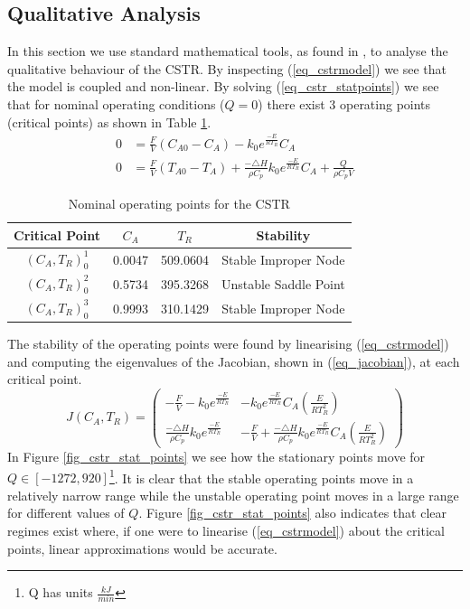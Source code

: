 \documentclass[../masters.tex]{subfiles}
\begin{document}
\subsection{Qualitative Analysis}
In this section we use standard mathematical tools, as found in \cite{edwardsandpenny}, to analyse the qualitative behaviour of the CSTR. By inspecting (\ref{eq_cstrmodel}) we see that the model is coupled and non-linear. By solving (\ref{eq_cstr_statpoints}) we see that for nominal operating conditions ($Q = 0$) there exist 3 operating points (critical points) as shown in Table \ref{tab_nominalstats}.
\begin{equation}
\begin{aligned}
0&= \frac{F}{V}\left( C_{A0}-C_A \right) - k_0e^{\frac{-E}{RT_R}}C_A \\
0 &= \frac{F}{V}\left(T_{A0}-T_A\right) + \frac{-\triangle H}{\rho C_p}k_0e^{\frac{-E}{RT_R}}C_A + \frac{Q}{\rho C_p V}
\end{aligned}
\label{eq_cstr_statpoints}
\end{equation}
\begin{table}[H]
\begin{center}
\begin{tabular}{c c c c}
\hline
Critical Point & $C_A$ & $T_R$ & Stability\\
\hline
$\left(C_A, T_R\right)_0^1$ & 0.0047 & 509.0604 & Stable Improper Node\\
$\left(C_A, T_R\right)_0^2$ & 0.5734 & 395.3268 & Unstable Saddle Point \\
$\left(C_A, T_R \right)_0^3$ & 0.9993 & 310.1429 & Stable Improper Node \\
\hline
\end{tabular}
\caption{Nominal operating points for  the CSTR}
\label{tab_nominalstats}
\end{center}
\end{table}
The stability of the operating points were found by linearising (\ref{eq_cstrmodel}) and computing the eigenvalues of the Jacobian, shown in (\ref{eq_jacobian}), at each critical point.
\begin{equation}
J(C_A, T_R) = \begin{pmatrix}
-\frac{F}{V} - k_0e^{\frac{-E}{RT_R}} & - k_0e^{\frac{-E}{RT_R}}C_A\left(\frac{E}{RT_R^2}\right) \\
\frac{-\triangle H}{\rho C_p}k_0e^{\frac{-E}{RT_R}} & -\frac{F}{V} + \frac{-\triangle H}{\rho C_p}k_0e^{\frac{-E}{RT_R}}C_A\left(\frac{E}{RT_R^2}\right) 
\end{pmatrix}
\label{eq_jacobian}
\end{equation}
In Figure \ref{fig_cstr_stat_points} we see how the stationary points move for $Q \in [-1272, 920]$\footnote{Q has units $\frac{kJ}{min}$}. It is clear that the stable operating points move in a relatively narrow range while the unstable operating point moves in a large range for different values of $Q$. Figure \ref{fig_cstr_stat_points} also indicates that clear regimes exist where, if one were to linearise (\ref{eq_cstrmodel}) about the critical points, linear approximations would be accurate.
\end{document}
